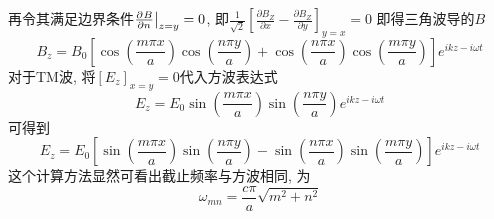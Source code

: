 \documentclass[UTF8,9pt]{ctexart}
\begin{document}
再令其满足边界条件$\frac{\partial^{} B}{\partial {n}^{}}\big|_{z=y}=0$, 即$\frac{1}{\sqrt{2}}\left[\frac{\partial B_{Z}}{\partial x}-\frac{\partial B_{Z}}{\partial y}\right]_{y=x}=0$
即得三角波导的$B$
$$ 
B_{z}=B_{0}\left[\cos \left(\frac{m \pi x}{a}\right) \cos \left(\frac{n \pi y}{a}\right)+\cos \left(\frac{n \pi x}{a}\right) \cos \left(\frac{m \pi y}{a}\right)\right] e^{i k z-i \omega t}
 $$
对于TM波, 将$\left[E_{z}\right]_{x=y}=0$代入方波表达式$$ 
E_{z}=E_{0} \sin \left(\frac{m \pi x}{a}\right) \sin \left(\frac{n \pi y}{a}\right) e^{i k z-i \omega t}
 $$
 可得到
 $$ 
E_{z}=E_{0}\left[\sin \left(\frac{m \pi x}{a}\right) \sin \left(\frac{n \pi y}{a}\right)-\sin \left(\frac{n \pi x}{a}\right) \sin \left(\frac{m \pi y}{a}\right)\right] e^{i k z-i \omega t}
 $$
这个计算方法显然可看出截止频率与方波相同, 为
$$ 
\omega_{m n}=\frac{c \pi}{a} \sqrt{m^{2}+n^{2}}
 $$
\end{document}
